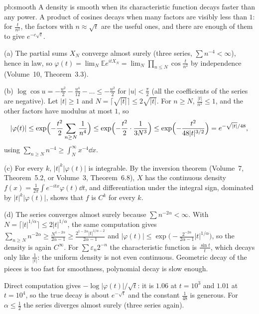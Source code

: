 \begin{solution}{pb:smooth}
\idea A density is smooth when its characteristic function decays faster than any power. A product of cosines decays when many factors are visibly less than $1$:
for $\frac t{n^2}$, the factors with $n\approx\sqrt t$ are the useful ones, and there are enough of them to give $e^{-c\sqrt t}$.

\writeup (a) The partial sums $X_N$ converge almost surely (three series, $\sum n^{-4}<\infty$), hence in law, so $\varphi(t)=\lim_N\mathbb Ee^{itX_N}=\lim_N\prod_{n\le N}\cos\frac t{n^2}$
by independence (Volume~10, Theorem~3.3).

(b) $\log\cos u=-\frac{u^2}2-\frac{u^4}{12}-\dots\le-\frac{u^2}2$ for $|u|<\frac\pi2$ (all the coefficients of the series are negative). Let $|t|\ge1$ and $N=\lceil\sqrt{|t|}\rceil\le2\sqrt{|t|}$. For
$n\ge N$, $\frac{|t|}{n^2}\le1$, and the other factors have modulus at most $1$, so
\[
|\varphi(t)|\le\exp\Bigl(-\frac{t^2}2\sum_{n\ge N}\frac1{n^4}\Bigr)\le\exp\Bigl(-\frac{t^2}2\cdot\frac1{3N^3}\Bigr)\le\exp\Bigl(-\frac{t^2}{48|t|^{3/2}}\Bigr)=e^{-\sqrt{|t|}/48},
\]
using $\sum_{n\ge N}n^{-4}\ge\int_N^\infty x^{-4}\dd x$.

(c) For every $k$, $|t|^k|\varphi(t)|$ is integrable. By the inversion theorem (Volume~7, Theorem~5.2, or Volume~3, Theorem~6.8), $X$ has the continuous density
$f(x)=\frac1{2\pi}\int e^{-itx}\varphi(t)\dd t$, and differentiation under the integral sign, dominated by $|t|^k|\varphi(t)|$, shows that $f$ is $C^k$ for every $k$.

(d) The series converges almost surely because $\sum n^{-2\alpha}<\infty$. With $N=\lceil|t|^{1/\alpha}\rceil\le2|t|^{1/\alpha}$, the same computation gives
$\sum_{n\ge N}n^{-2\alpha}\ge\frac{N^{1-2\alpha}}{2\alpha-1}\ge\frac{2^{1-2\alpha}|t|^{1/\alpha-2}}{2\alpha-1}$ and
$|\varphi(t)|\le\exp\bigl(-\frac{2^{-2\alpha}}{2\alpha-1}|t|^{1/\alpha}\bigr)$, so the density is again $C^\infty$. For $\sum\varepsilon_n2^{-n}$ the characteristic function is
$\frac{\sin t}t$, which decays only like $\frac1{|t|}$: the uniform density is not even continuous. Geometric decay of the pieces is too fast for smoothness, polynomial decay is
slow enough.

\leads Direct computation gives $-\log|\varphi(t)|/\sqrt t$: it is $1.06$ at $t=10^3$ and $1.01$ at $t=10^4$, so the true decay is about $e^{-\sqrt t}$ and the constant $\frac1{48}$ is
generous. For $\alpha\le\frac12$ the series diverges almost surely (three series again).
\end{solution}

